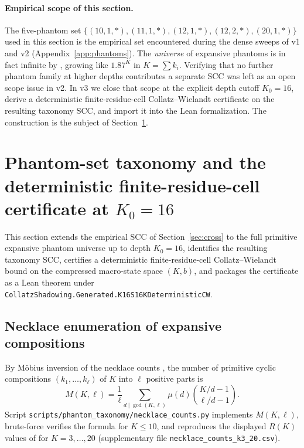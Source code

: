 \documentclass[11pt,a4paper]{article}
\theoremstyle{definition}
\begin{document}
\paragraph{Empirical scope of this section.}
The five-phantom set $\{(10,1,*), (11,1,*), (12,1,*), (12,2,*), (20,1,*)\}$
used in this section is the empirical set encountered during the
dense sweeps of v1 and v2 (Appendix~\ref{app:phantoms}). The
\emph{universe} of expansive phantoms is in fact infinite by
\cite[Theorem~7.15]{chang2026}, growing like $1.87^K$ in
$K = \sum k_i$. Verifying that no further phantom family at higher
depths contributes a separate SCC was left as an open scope issue
in v2. In v3 we close that scope at the explicit depth cutoff
$K_0 = 16$, derive a deterministic finite-residue-cell
Collatz--Wielandt certificate on the resulting taxonomy SCC, and
import it into the Lean formalization. The construction is the
subject of Section~\ref{sec:taxonomy}.

\section{Phantom-set taxonomy and the deterministic
finite-residue-cell certificate at $K_0 = 16$}
\label{sec:taxonomy}

This section extends the empirical SCC of Section~\ref{sec:cross} to
the full primitive expansive phantom universe up to depth
$K_0 = 16$, identifies the resulting taxonomy SCC, certifies a
deterministic finite-residue-cell Collatz--Wielandt bound on the
compressed macro-state space $(K, b)$, and packages the certificate
as a Lean theorem under
\texttt{CollatzShadowing.Generated.K16S16KDeterministicCW}.

\subsection{Necklace enumeration of expansive compositions}
\label{sec:necklace}

By M\"obius inversion of the necklace counts
\cite[\S 2]{chang2026}, the number of primitive cyclic compositions
$(k_1, \ldots, k_\ell)$ of $K$ into $\ell$ positive parts is
\[
M(K, \ell)
= \frac{1}{\ell}
  \sum_{d \mid \gcd(K, \ell)} \mu(d)
  \binom{K/d - 1}{\ell/d - 1}.
\]
Script
\verb|scripts/phantom_taxonomy/necklace_counts.py|
implements $M(K, \ell)$, brute-force verifies the formula for
$K \le 10$, and reproduces the displayed $R(K)$ values of
\cite[\S 7.3]{chang2026} for $K = 3, \ldots, 20$
(supplementary file
\verb|necklace_counts_k3_20.csv|).
\end{document}
